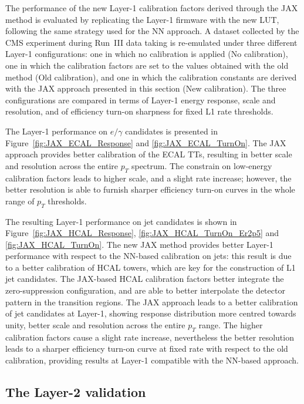 \bigbreak

The performance of the new Layer-1 calibration factors derived through the JAX method is evaluated by replicating the Layer-1 firmware with the new LUT, following the same strategy used for the NN approach. A dataset collected by the CMS experiment during Run~III data taking is re-emulated under three different Layer-1 configurations: one in which no calibration is applied (No calibration), one in which the calibration factors are set to the values obtained with the old method (Old calibration), and one in which the calibration constants are derived with the JAX approach presented in this section (New calibration). 
The three configurations are compared in terms of Layer-1 energy response, scale and resolution, and of efficiency turn-on sharpness for fixed L1 rate thresholds. 

The Layer-1 performance on $e/\gamma$ candidates is presented in Figure~\ref{fig:JAX_ECAL_Response} and \ref{fig:JAX_ECAL_TurnOn}. The JAX approach provides better calibration of the ECAL TTs, resulting in better scale and resolution across the entire $p_T$ spectrum. The constrain on low-energy calibration factors leads to higher scale, and a slight rate increase; however, the better resolution is able to furnish sharper efficiency turn-on curves in the whole range of $p_T$ thresholds.

The resulting Layer-1 performance on jet candidates is shown in Figure~\ref{fig:JAX_HCAL_Response}, \ref{fig:JAX_HCAL_TurnOn_Er2p5} and \ref{fig:JAX_HCAL_TurnOn}.
The new JAX method provides better Layer-1 performance with respect to the NN-based calibration on jets: this result is due to a better calibration of HCAL towers, which are key for the construction of L1 jet candidates. The JAX-based HCAL calibration factors better integrate the zero-suppression configuration, and are able to better interpolate the detector pattern in the transition regions. The JAX approach leads to a better calibration of jet candidates at Layer-1, showing response distribution more centred towards unity, better scale and resolution across the entire $p_T$ range. 
The higher calibration factors cause a slight rate increase, nevertheless the better resolution leads to a sharper efficiency turn-on curve at fixed rate with respect to the old calibration, providing results at Layer-1 compatible with the NN-based approach.

\subsection{The Layer-2 validation} 

